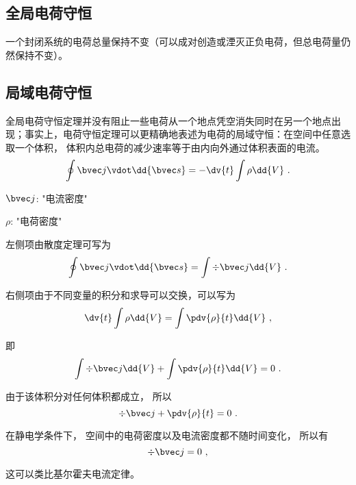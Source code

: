 
\subsection{全局电荷守恒}
一个封闭系统的电荷总量保持不变\cite{GriffE}（可以成对创造或湮灭正负电荷，但总电荷量仍然保持不变）。

\subsection{局域电荷守恒}
全局电荷守恒定理并没有阻止一些电荷从一个地点凭空消失同时在另一个地点出现；事实上，电荷守恒定理可以更精确地表述为电荷的局域守恒：在空间中任意选取一个体积， 体积内总电荷的减少速率等于由内向外通过体积表面的电流。\cite{GriffE}
\begin{equation}
\oint \bvec j \vdot \dd{\bvec s}  =  - \dv{t} \int \rho \dd{V}~.
\end{equation} 

$\bvec j$: "电流密度"

$\rho$: "电荷密度"

左侧项由散度定理可写为
\begin{equation}
\oint \bvec j \vdot \dd{\bvec s}  =\int \div \bvec j \dd{V}~.
\end{equation} 

右侧项由于不同变量的积分和求导可以交换，可以写为%
\begin{equation}
\dv{t} \int \rho  \dd{V}  = \int \pdv{\rho}{t} \dd{V}~,
\end{equation}

即
\begin{equation}
\int \div \bvec j \dd{V} + \int \pdv{\rho}{t} \dd{V} = 0~.
\end{equation} 

由于该体积分对任何体积都成立， 所以
\begin{equation}\label{eq_ChgCsv_4}
\div \bvec j + \pdv{\rho}{t} = 0~.
\end{equation}

在静电学条件下， 空间中的电荷密度以及电流密度都不随时间变化， 所以有
\begin{equation}
\div \bvec j = 0~,
\end{equation}

这可以类比基尔霍夫电流定律。
